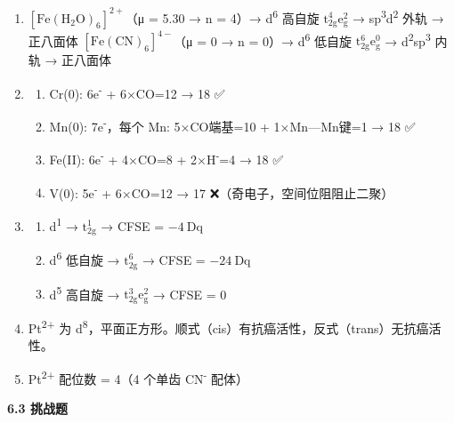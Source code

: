 \documentclass[a4paper,11pt]{ctexart}
\providecommand{\tightlist}{\setlength{\itemsep}{0pt}\setlength{\parskip}{0pt}}
\begin{document}
\begin{enumerate}
\def\labelenumi{\arabic{enumi}.}
\setcounter{enumi}{4}
\item
  \textbf{\([\mathrm{Fe(H_2O)_6}]^{2+}\)}（μ = 5.30 → n = 4）→ d\textsuperscript{6} 高自旋 \(\mathrm{t_{2g}^4 e_g^2}\) → sp\textsuperscript{3}d\textsuperscript{2} 外轨 → 正八面体
  \textbf{\([\mathrm{Fe(CN)_6}]^{4-}\)}（μ = 0 → n = 0）→ d\textsuperscript{6} 低自旋 \(\mathrm{t_{2g}^6 e_g^0}\) → d\textsuperscript{2}sp\textsuperscript{3} 内轨 → 正八面体
\item
  \begin{enumerate}
  \def\labelenumii{(\arabic{enumii})}
  \tightlist
  \item
    Cr(0): 6e\textsuperscript{-} + 6×CO=12 → 18 ✅
  \item
    Mn(0): 7e\textsuperscript{-}，每个 Mn: 5×CO端基=10 + 1×Mn---Mn键=1 → 18 ✅
  \item
    Fe(II): 6e\textsuperscript{-} + 4×CO=8 + 2×H\textsuperscript{-}=4 → 18 ✅
  \item
    V(0): 5e\textsuperscript{-} + 6×CO=12 → 17 ❌（奇电子，空间位阻阻止二聚）
  \end{enumerate}
\item
  \begin{enumerate}
  \def\labelenumii{(\arabic{enumii})}
  \tightlist
  \item
    d\textsuperscript{1} → \(\mathrm{t_{2g}^1}\) → CFSE = \(-4\ \mathrm{Dq}\)
  \item
    d\textsuperscript{6} 低自旋 → \(\mathrm{t_{2g}^6}\) → CFSE = \(-24\ \mathrm{Dq}\)
  \item
    d\textsuperscript{5} 高自旋 → \(\mathrm{t_{2g}^3 e_g^2}\) → CFSE = 0
  \end{enumerate}
\item
  Pt\textsuperscript{2+} 为 d\textsuperscript{8}，平面正方形。顺式（cis）有抗癌活性，反式（trans）无抗癌活性。
\item
  Pt\textsuperscript{2+} 配位数 = 4（4 个单齿 CN\textsuperscript{-} 配体）
\end{enumerate}

\textbf{6.3 挑战题}
\end{document}
